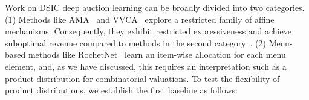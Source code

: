 Work on DSIC deep auction learning can be broadly divided into two categories. (1) Methods like AMA~\cite{curry2022differentiable,duan2023scalable} and VVCA~\cite{duan2024scalable} explore a
restricted family of affine mechanisms. Consequently, they exhibit restricted expressiveness and achieve suboptimal revenue compared to methods in the second category~\cite{dutting2024optimal}.
(2) Menu-based methods like RochetNet~\cite{dutting2024optimal} learn an item-wise allocation for each menu element, and, as we have discussed, this requires an interpretation such as a product distribution for combinatorial valuations.
To test the flexibility of product distributions, we establish the first baseline as follows:

